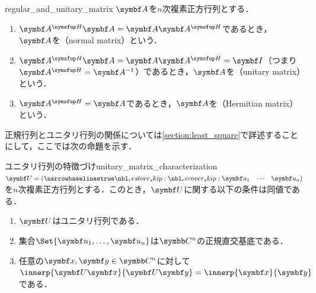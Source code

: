 \documentclass[../../main]{subfiles}
\begin{document}
\begin{definition}{}{regular_and_unitary_matrix}
  \(\mat{A}\)を\(n\)次複素正方行列とする．
  \begin{enumerate}
    \item \(\htrps{\mat{A}}\mat{A}=\mat{A}\htrps{\mat{A}}\)であるとき，\(\mat{A}\)を（normal matrix）という．
    \item \(\htrps{\mat{A}}\mat{A}=\mat{A}\htrps{\mat{A}}=\imat\)（つまり\(\htrps{\mat{A}}=\mat{A}^{-1}\)）であるとき，\(\mat{A}\)を（unitary matrix）という．
    \item \(\htrps{\mat{A}}=\mat{A}\)であるとき，\(\mat{A}\)を（Hermitian matrix）という．
  \end{enumerate}
\end{definition}

正規行列とユニタリ行列の関係については\cref{section:least_square}で詳述することにして，ここでは次の命題を示す．

\begin{proposition}{ユニタリ行列の特徴づけ}{unitary_matrix_characterization}
  \(\mat{U}=\rowvect{\vect{u}_1 & \cdots & \vect{u}_n}\)を\(n\)次複素正方行列とする．このとき，\(\mat{U}\)に関する以下の条件は同値である．
  \begin{enumerate}
    \item \(\mat{U}\)はユニタリ行列である．
    \item 集合\(\Set{\vect{u}_1,\dots,\vect{u}_n}\)は\(\numset{C}^n\)の正規直交基底である．
    \item 任意の\(\vect{x},\vect{y}\in\numset{C}^n\)に対して\(\innerp{\mat{U}\vect{x}}{\mat{U}\vect{y}}=\innerp{\vect{x}}{\vect{y}}\)である．
  \end{enumerate}
\end{proposition}
\end{document}

